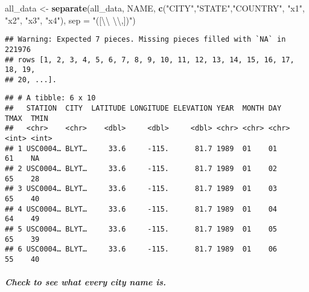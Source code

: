 \documentclass[]{article}
\newenvironment{Shaded}{\begin{snugshade}}{\end{snugshade}}
\newcommand{\CharTok}[1]{\textcolor[rgb]{0.31,0.60,0.02}{#1}}
\newcommand{\DataTypeTok}[1]{\textcolor[rgb]{0.13,0.29,0.53}{#1}}
\newcommand{\KeywordTok}[1]{\textcolor[rgb]{0.13,0.29,0.53}{\textbf{#1}}}
\newcommand{\NormalTok}[1]{#1}
\newcommand{\OperatorTok}[1]{\textcolor[rgb]{0.81,0.36,0.00}{\textbf{#1}}}
\newcommand{\StringTok}[1]{\textcolor[rgb]{0.31,0.60,0.02}{#1}}
\let\oldsubparagraph\subparagraph
\renewcommand{\subparagraph}[1]{\oldsubparagraph{#1}\mbox{}}
\begin{document}
\begin{Shaded}
\begin{Highlighting}[]
\NormalTok{all_data <-}\StringTok{ }\KeywordTok{separate}\NormalTok{(all_data, NAME, }\KeywordTok{c}\NormalTok{(}\StringTok{"CITY"}\NormalTok{,}\StringTok{"STATE"}\NormalTok{,}\StringTok{"COUNTRY"}\NormalTok{, }\StringTok{"x1"}\NormalTok{, }\StringTok{"x2"}\NormalTok{, }\StringTok{"x3"}\NormalTok{, }\StringTok{"x4"}\NormalTok{), }
    \DataTypeTok{sep =} \StringTok{"([}\CharTok{\textbackslash{}\textbackslash{}}\StringTok{ }\CharTok{\textbackslash{}\textbackslash{}}\StringTok{,])"}\NormalTok{)}
\end{Highlighting}
\end{Shaded}

\begin{verbatim}
## Warning: Expected 7 pieces. Missing pieces filled with `NA` in 221976
## rows [1, 2, 3, 4, 5, 6, 7, 8, 9, 10, 11, 12, 13, 14, 15, 16, 17, 18, 19,
## 20, ...].
\end{verbatim}

\begin{Shaded}
\end{Shaded}

\begin{verbatim}
## # A tibble: 6 x 10
##   STATION  CITY  LATITUDE LONGITUDE ELEVATION YEAR  MONTH DAY    TMAX  TMIN
##   <chr>    <chr>    <dbl>     <dbl>     <dbl> <chr> <chr> <chr> <int> <int>
## 1 USC0004… BLYT…     33.6     -115.      81.7 1989  01    01       61    NA
## 2 USC0004… BLYT…     33.6     -115.      81.7 1989  01    02       65    28
## 3 USC0004… BLYT…     33.6     -115.      81.7 1989  01    03       65    40
## 4 USC0004… BLYT…     33.6     -115.      81.7 1989  01    04       64    49
## 5 USC0004… BLYT…     33.6     -115.      81.7 1989  01    05       65    39
## 6 USC0004… BLYT…     33.6     -115.      81.7 1989  01    06       55    40
\end{verbatim}

\hypertarget{check-to-see-what-every-city-name-is.}{%
\subparagraph{Check to see what every city name
is.}\label{check-to-see-what-every-city-name-is.}}

\begin{Shaded}
\end{Shaded}
\end{document}
